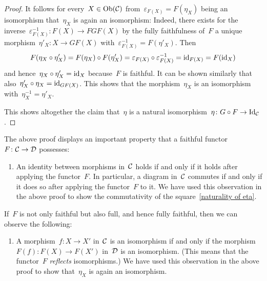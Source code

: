 \begin{proof}
  It follows for every~$X \in \operatorname{Ob}(\mathcal{C})$ from~$\varepsilon_{F(X)} = F(\eta_X)$ being an isomorphism that~$\eta_X$ is again an isomorphism:
  Indeed, there exists for the inverse~$\varepsilon_{F(X)}^{-1} \colon F(X) \to FGF(X)$ by the fully faithfulness of~$F$ a unique morphism~$\eta'_X \colon X \to GF(X)$ with~$\varepsilon_{F(X)}^{-1} = F(\eta'_X)$.
  Then
  \[
      F(\eta_X \circ \eta'_X)
    = F(\eta_X) \circ F(\eta'_X)
    = \varepsilon_{F(X)} \circ \varepsilon_{F(X)}^{-1}
    = \operatorname{id}_{F(X)}
    = F(\operatorname{id}_X)
  \]
  and hence~$\eta_X \circ \eta'_X = \operatorname{id}_X$ because~$F$ is faithful.
  It can be shown similarly that also~$\eta'_X \circ \eta_X = \operatorname{id}_{GF(X)}$.
  This shows that the morphism~$\eta_X$ is an isomorphism with~$\eta_X^{-1} = \eta'_X$.
  
  This shows altogether the claim that~$\eta$ is a natural isomorphism~$\eta \colon G \circ F \to \mathrm{Id}_{\mathcal{C}}$.
\end{proof}


\begin{remark*}
  The above proof displays an important property that a faithful functor~$F \colon \mathcal{C} \to \mathcal{D}$ possesses:
  \begin{enumerate}
    \item
      An identity between morphisms in~$\mathcal{C}$ holds if and only if it holds after applying the functor~$F$.
      In particular, a diagram in~$\mathcal{C}$ commutes if and only if it does so after applying the functor~$F$ to it.
      We have used this observation in the above proof to show the commutativity of the square~\eqref{naturality of eta}.
  \end{enumerate}
  If~$F$ is not only faithful but also full, and hence fully faithful, then we can observe the following:
  \begin{enumerate}[resume]
    \item
      A morphism~$f \colon X \to X'$ in~$\mathcal{C}$ is an isomorphism if and only if the morphism~$F(f) \colon F(X) \to F(X')$ in~$\mathcal{D}$ is an isomorphism.
      (This means that the functor~$F$ \emph{reflects} isomorphisms.)
      We have used this observation in the above proof to show that~$\eta_X$ is again an isomorphism.
  \end{enumerate}
\end{remark*}


